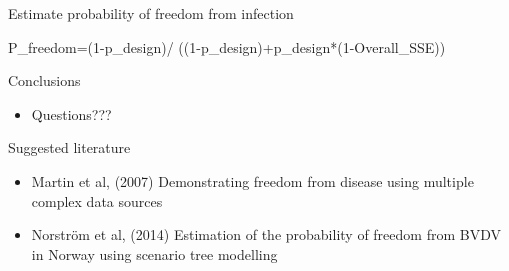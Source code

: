\documentclass[
  ignorenonframetext,
]{beamer}
\newenvironment{Shaded}{\begin{snugshade}}{\end{snugshade}}
\newcommand{\DecValTok}[1]{\textcolor[rgb]{0.00,0.00,0.81}{#1}}
\newcommand{\NormalTok}[1]{#1}
\newcommand{\OtherTok}[1]{\textcolor[rgb]{0.56,0.35,0.01}{#1}}
\newcommand{\SpecialCharTok}[1]{\textcolor[rgb]{0.00,0.00,0.00}{#1}}
\providecommand{\tightlist}{%
  \setlength{\itemsep}{0pt}\setlength{\parskip}{0pt}}
\begin{document}
\begin{frame}[fragile]{Estimate probability of freedom from infection}
\protect\hypertarget{estimate-probability-of-freedom-from-infection-1}{}
\begin{Shaded}
\begin{Highlighting}[]
\NormalTok{P\_freedom}\OtherTok{=}\NormalTok{(}\DecValTok{1}\SpecialCharTok{{-}}\NormalTok{p\_design)}\SpecialCharTok{/}
\NormalTok{  ((}\DecValTok{1}\SpecialCharTok{{-}}\NormalTok{p\_design)}\SpecialCharTok{+}\NormalTok{p\_design}\SpecialCharTok{*}\NormalTok{(}\DecValTok{1}\SpecialCharTok{{-}}\NormalTok{Overall\_SSE))}
\end{Highlighting}
\end{Shaded}
\end{frame}

\begin{frame}{Conclusions}
\protect\hypertarget{conclusions}{}
\begin{itemize}
\tightlist
\item
  Questions???
\end{itemize}

Suggested literature

\begin{itemize}
\tightlist
\item
  Martin et al, (2007) Demonstrating freedom from disease using multiple
  complex data sources
\item
  Norström et al, (2014) Estimation of the probability of freedom from
  BVDV in Norway using scenario tree modelling
\end{itemize}
\end{frame}
\end{document}

